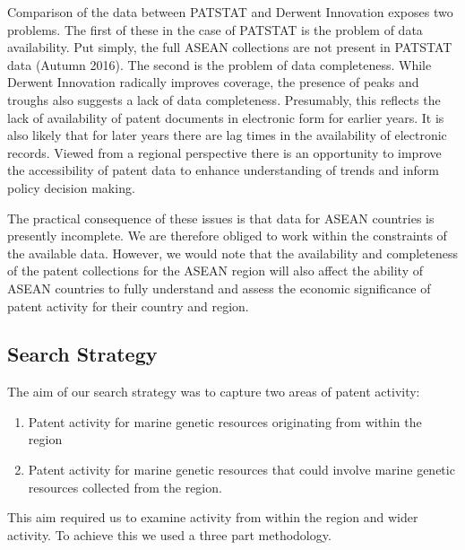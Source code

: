 \documentclass[openany]{book}
\providecommand{\tightlist}{%
  \setlength{\itemsep}{0pt}\setlength{\parskip}{0pt}}
\theoremstyle{definition}
\theoremstyle{definition}
\theoremstyle{definition}
\theoremstyle{remark}
\begin{document}
Comparison of the data between PATSTAT and Derwent Innovation exposes
two problems. The first of these in the case of PATSTAT is the problem
of data availability. Put simply, the full ASEAN collections are not
present in PATSTAT data (Autumn 2016). The second is the problem of data
completeness. While Derwent Innovation radically improves coverage, the
presence of peaks and troughs also suggests a lack of data completeness.
Presumably, this reflects the lack of availability of patent documents
in electronic form for earlier years. It is also likely that for later
years there are lag times in the availability of electronic records.
Viewed from a regional perspective there is an opportunity to improve
the accessibility of patent data to enhance understanding of trends and
inform policy decision making.

The practical consequence of these issues is that data for ASEAN
countries is presently incomplete. We are therefore obliged to work
within the constraints of the available data. However, we would note
that the availability and completeness of the patent collections for the
ASEAN region will also affect the ability of ASEAN countries to fully
understand and assess the economic significance of patent activity for
their country and region.

\hypertarget{search-strategy}{%
\subsection{Search Strategy}\label{search-strategy}}

The aim of our search strategy was to capture two areas of patent
activity:

\begin{enumerate}
\def\labelenumi{\arabic{enumi}.}
\tightlist
\item
  Patent activity for marine genetic resources originating from within
  the region
\item
  Patent activity for marine genetic resources that could involve marine
  genetic resources collected from the region.
\end{enumerate}

This aim required us to examine activity from within the region and
wider activity. To achieve this we used a three part methodology.
\end{document}
